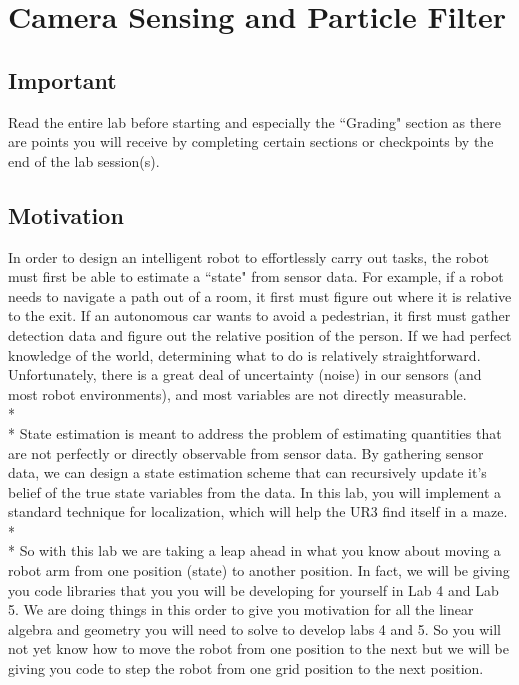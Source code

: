 \chapter{Camera Sensing and Particle Filter}
\section{Important}
Read the entire lab before starting and especially the ``Grading" section as there are points you will receive by completing certain sections or checkpoints by the end of the lab session(s). 

\section{Motivation}
In order to design an intelligent robot to effortlessly carry out tasks, the robot must first be able to estimate a ``state" from sensor data.  For example, if a robot needs to navigate a path out of a room, it first must figure out where it is relative to the exit.  If an autonomous car wants to avoid a pedestrian, it first must gather detection data and figure out the relative position of the person. If we had perfect knowledge of the world, determining what to do is relatively straightforward. Unfortunately, there is a great deal of uncertainty (noise) in our sensors (and most robot environments), and most variables are not directly measurable. 
\\* 
\\* State estimation is meant to address the problem of estimating quantities that are not perfectly or directly observable from sensor data.  By gathering sensor data, we can design a state estimation scheme that can recursively update it's belief of the true state variables from the data. In this lab, you will implement a standard technique for localization, which will help the UR3 find itself in a maze.  
\\* 
\\* So with this lab we are taking a leap ahead in what you know about moving a robot arm from one position (state) to another position. In fact, we will be giving you code libraries that you you will be developing for yourself in Lab 4 and Lab 5. We are doing things in this order to give you motivation for all the linear algebra and geometry you will need to solve to develop labs 4 and 5.  So you will not yet know how to move the robot from one position to the next but we will be giving you code to step the robot from one grid position to the next position.  
